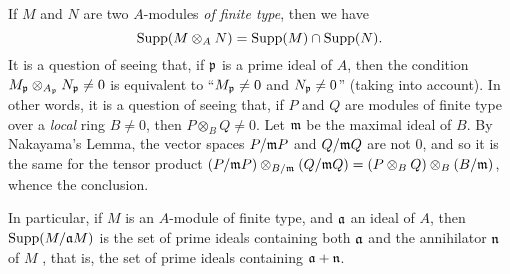 \begin{env}[1.7.5]
\label{0.1.7.5}
If $M$ and $N$ are two $A$-modules \emph{of finite type}, then we have
\[
  {\mathop{\mathrm{Supp}}\nolimits}(M\otimes_A N)={\mathop{\mathrm{Supp}}\nolimits}(M)\cap{\mathop{\mathrm{Supp}}\nolimits}(N).
\]
It is a question of seeing that, if $\mathfrak{p}$ is a prime ideal of $A$, then the condition $M_\mathfrak{p}\otimes_{A_\mathfrak{p}}N_\mathfrak{p}\neq 0$ is equivalent to ``$M_\mathfrak{p}\neq 0$ and $N_\mathfrak{p}\neq 0$'' (taking  into account).
In other words, it is a question of seeing that, if $P$ and $Q$ are modules of finite type over a \emph{local} ring $B\neq 0$, then $P\otimes_B Q\neq 0$. Let $\mathfrak{m}$ be the maximal ideal of $B$.
By Nakayama's Lemma, the vector spaces $P/\mathfrak{m}P$ and $Q/\mathfrak{m}Q$ are not $0$, and so it is the same for the tensor product $(P/\mathfrak{m}P)\otimes_{B/\mathfrak{m}}(Q/\mathfrak{m}Q)=(P\otimes_B Q)\otimes_B(B/\mathfrak{m})$, whence the conclusion.

In particular, if $M$ is an $A$-module of finite type, and $\mathfrak{a}$ an ideal of $A$, then ${\mathop{\mathrm{Supp}}\nolimits}(M/\mathfrak{a}M)$ is the set of prime ideals containing both $\mathfrak{a}$ and the annihilator $\mathfrak{n}$ of $M$ , that is, the set of prime ideals containing $\mathfrak{a}+\mathfrak{n}$.
\end{env}
